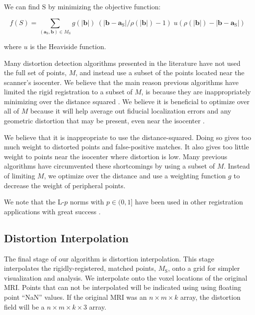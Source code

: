 \documentclass[12pt]{article}
\begin{document}
We can find $\mathrm{S}$ by minimizing the objective function:

\begin{equation*}
f(S) =
\sum_{(\textbf{a}_\textrm{S}, \textbf{b}) \in M_\textrm{S}} g(\left|\mathbf{b}\right|)
\;
(\left|\mathbf{b} - \mathbf{a}_\textrm{S}\right|/\rho(|\mathbf{b}|) - 1)
\;
u(\rho(|\mathbf{b}|) - \left|\mathbf{b} - \mathbf{a}_\textrm{S}\right|)
\end{equation*}

where $u$ is the Heaviside function.

Many distortion detection algorithms presented in the literature have not used the full set of points, $M$, and instead use a subset of the points located near the scanner's isocenter.  We believe that the main reason previous algorithms have limited the rigid registration to a subset of $M$, is because they are inappropriately minimizing over the distance squared \cite{wang2005}.  We believe it is beneficial to optimize over all of $M$ because it will help average out fiducial localization errors and any geometric distortion that may be present, even near the isocenter \cite{baldwin2007}.

We believe that it is inappropriate to use the distance-squared.  Doing so gives too much weight to distorted points and false-positive matches.  It also gives too little weight to points near the isocenter where distortion is low.  Many previous algorithms have circumvented these shortcomings by using a subset of $M$.  Instead of limiting $M$, we optimize over the distance and use a weighting function $g$ to decrease the weight of peripheral points.

We note that the L-$p$ norms with $p \in (0, 1]$ have been used in other registration applications with great success \cite{bouaziz2013}.  

\subsection{Distortion Interpolation}

The final stage of our algorithm is distortion interpolation.  This stage interpolates the rigidly-registered, matched points, $M_\textrm{S}$, onto a grid for simpler visualization and analysis.  We interpolate onto the voxel locations of the original MRI.  Points that can not be interpolated will be indicated using using floating point ``NaN'' values.  If the original MRI was an $n \times m \times k$ array, the distortion field will be a $n \times m \times k \times 3$ array.
\end{document}
